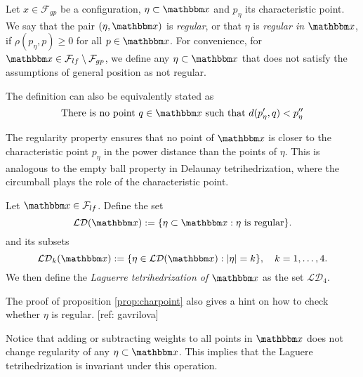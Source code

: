 		


\begin{definition}
	Let $x\in \mathcal F_{gp}$ be a configuration, $\eta \subset \x$ and $p_\eta$ its characteristic point. We say that the pair $(\eta,\x)$ is \textit{regular}, or that $\eta$ is \textit{regular in} $\x$, if $\rho(p_\eta,p)\geq 0$ for all $p\in\x$.	
	For convenience, for $\x \in \mathcal F_{lf}\setminus \mathcal F_{gp}$, we define any $\eta\subset \x$ that does not satisfy the assumptions of general position as not regular.
\end{definition}
The definition can also be equivalently stated as 
$$\text{There is no point } q\in\x \text{ such that } d(p'_\eta,q)<p''_\eta$$

The regularity property ensures that no point of $\x$ is closer to the characteristic point $p_\eta$ in the power distance than the points of $\eta$. This is analogous to the empty ball property in Delaunay tetrihedrization, where the circumball plays the role of the characteristic point.   




\begin{definition}
	Let $\x \in \mathcal F_{lf}$. Define the set 
	$$\mathcal {LD}(\x) := \{\eta\subset \x: \eta \text{ is regular}\}.$$
	and its subsets
	$$\mathcal {LD}_k(\x) := \{\eta \in \mathcal {LD}(\x): |\eta|=k \},\quad k = 1,\dots,4.$$
	We then define the \textit{Laguerre tetrihedrization of $\x$} as the set $\mathcal {LD}_4$. 
\end{definition}


\begin{remark}\label{r:construct}
	The proof of proposition \ref{prop:charpoint} also gives a hint on how to check whether $\eta$ is regular. [ref: gavrilova]\tbd 
\end{remark}



\begin{remark}
	Notice that adding or subtracting weights to all points in $\x$ does not change regularity of any $\eta \subset \x$. This implies that the Laguere tetrihedrization is invariant under this operation.  
\end{remark}

\begin{remark}\label{rem:LaguerreToDelaunay}
\tbd
\end{remark}


